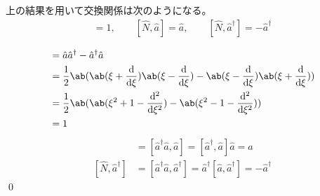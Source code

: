 \documentclass[uplatex,dvipdfmx,a4paper,11pt]{jlreq}
\makeatletter
\numberwithin{equation}{section}
\theoremstyle{definition}
\renewenvironment{proof}[1][\proofname]{\par
  \normalfont
  \topsep6\p@\@plus6\p@ \trivlist
  \item[\hskip\labelsep{\bfseries #1}\@addpunct{\bfseries}]\ignorespaces\quad\par
}{%
  \qed\endtrivlist\@endpefalse
}
\renewcommand\proofname{証明}
\makeatother
\begin{document}
\begin{proposition}
  上の結果を用いて交換関係は次のようになる。
  \begin{align}
    [\hat{a}, \hat{a}^\dagger] = 1, \qquad [\hat{N}, \hat{a}] = \hat{a}, \qquad [\hat{N}, \hat{a}^\dagger] = -\hat{a}^\dagger
  \end{align}
\end{proposition}
\begin{proof}
  \begin{align}
    [\hat{a}, \hat{a}^\dagger] & = \hat{a}\hat{a}^\dagger - \hat{a}^\dagger\hat{a}                                                 \\
                               & = \frac{1}{2}\ab(\ab(\xi + \dv{\xi})\ab(\xi - \dv{\xi}) - \ab(\xi - \dv{\xi})\ab(\xi + \dv{\xi})) \\
                               & = \frac{1}{2}\ab(\ab(\xi^2 + 1 - \dv[2]{\xi}) - \ab(\xi^2 - 1 - \dv[2]{\xi}))                     \\
                               & = 1
  \end{align}
  \begin{align}
    [\hat{N}, \hat{a}]         & = [\hat{a}^\dagger\hat{a}, \hat{a}] = [\hat{a}^\dagger, \hat{a}]\hat{a} = \hat{a}                          \\
    [\hat{N}, \hat{a}^\dagger] & = [\hat{a}^\dagger\hat{a}, \hat{a}^\dagger] = \hat{a}^\dagger[\hat{a}, \hat{a}^\dagger] = -\hat{a}^\dagger
  \end{align}
\end{proof}
\end{document}
